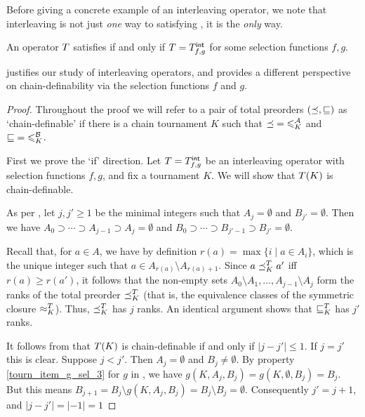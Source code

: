Before giving a concrete example of an interleaving operator, we note that
interleaving is not just \emph{one} way to satisfying \chaindef{}, it
is the \emph{only} way.

\begin{theorem}
   \label{tourn_result_chaindef_iff_interleaving}

    An operator $T$ satisfies \chaindef{} if and only if $T =
    {T_{f,g}^\mathsf{int}}$ for some selection functions $f, g$.

\end{theorem}

 justifies our study of interleaving
operators, and provides a different perspective on chain-definability via the
selection functions $f$ and $g$.

\begin{proof}

    Throughout the proof we will refer to a pair of total preorders
    $({\preceq}, {\sqsubseteq})$ as `chain-definable' if there is a chain tournament $K$
    such that ${\preceq} = {\leqslant^{\mathcal{A}}_K}$ and ${\sqsubseteq} = {\leqslant^{\mathcal{B}}_K}$.

    First we prove the `if' direction. Let $T = {T_{f,g}^\mathsf{int}}$ be an
    interleaving operator with selection functions $f, g$, and fix a
    tournament $K$. We will show that $T(K)$ is chain-definable.

    As per , let $j, j' \ge 1$ be the
    minimal integers such that $A_j = \emptyset$ and $B_{j'} = \emptyset$. Then
    we have $A_0 \supset \cdots \supset A_{j-1} \supset A_j = \emptyset$ and
    $B_0 \supset \cdots \supset B_{j'-1} \supset B_{j'} = \emptyset$.

    Recall that, for $a \in A$, we have by definition $r(a) = \max\{i \mid a
    \in A_i\}$, which is the unique integer such that $a \in A_{r(a)} \setminus
    A_{{r(a)}+1}$. Since $a \preceq_K^T a'$ iff $r(a) \ge r(a')$, it follows
    that the non-empty sets $A_0 \setminus A_1, \ldots, A_{j-1} \setminus A_j$
    form the ranks of the total preorder ${\preceq_K^T}$ (that is, the
    equivalence classes of the symmetric closure ${\approx_K^T}$). Thus,
    ${\preceq_K^T}$ has $j$ ranks. An identical argument shows that
    ${\sqsubseteq_K^T}$ has $j'$ ranks.

    It follows from  that $T(K)$
    is chain-definable if and only if $|j - j'| \le 1$.  If $j = j'$ this is
    clear. Suppose $j < j'$.  Then $A_j = \emptyset$ and $B_j \ne \emptyset$.
    By property \cref{tourn_item_g_sel_3} for $g$ in
    , we have $g(K, A_j, B_j) = g(K, \emptyset,
    B_j) = B_j$. But this means $B_{j+1} = B_j \setminus g(K, A_j, B_j) = B_j
    \setminus B_j = \emptyset$.  Consequently $j' = j+1$, and $|j - j'| = |-1|
    = 1$


\end{proof}

